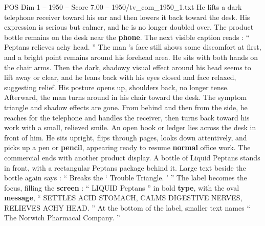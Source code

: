 \begin{textsample}{POS Dim 1 – 1950 – Score 7.00 – 1950/tv\_com\_1950\_1.txt}
He lifts a dark telephone receiver toward his ear and then lowers it back toward the desk.
His expression is serious but calmer, and he is no longer doubled over.
The product bottle remains on the desk near the \textbf{phone}.
The next visible caption reads : “ Peptans relieves achy head. ” The man ’s face still shows some discomfort at first, and a bright point remains around his forehead area.
He sits with both hands on the chair arms.
Then the dark, shadowy visual effect around his head seems to lift away or clear, and he leans back with his eyes closed and face relaxed, suggesting relief.
His posture opens up, shoulders back, no longer tense.
Afterward, the man turns around in his chair toward the desk.
The symptom triangle and shadow effects are gone.
From behind and then from the side, he reaches for the telephone and handles the receiver, then turns back toward his work with a small, relieved smile.
An open book or ledger lies across the desk in front of him.
He sits upright, flips through pages, looks down attentively, and picks up a pen or \textbf{pencil}, appearing ready to resume \textbf{normal} office work.
The commercial ends with another product display.
A bottle of Liquid Peptans stands in front, with a rectangular Peptans package behind it.
Large text beside the bottle again says : “ Breaks the ‘ Trouble Triangle. ’ ” The label becomes the focus, filling the \textbf{screen} : “ LIQUID Peptans ” in bold \textbf{type}, with the oval \textbf{message}, “ SETTLES ACID STOMACH, CALMS DIGESTIVE NERVES, RELIEVES ACHY HEAD. ” At the bottom of the label, smaller text names “ The Norwich Pharmacal Company. ”

\end{textsample}
